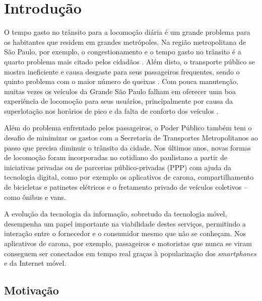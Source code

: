 \chapter{Introdução}
O tempo gasto no trânsito para a locomoção diária é um grande problema para os habitantes que residem em grandes metrópoles. Na região metropolitana de São Paulo, por exemplo, o congestionamento e o tempo gasto no trânsito é a quarto problema mais citado pelos cidadãos \cite{viveremsp}. Além disto, o transporte público se mostra ineficiente e causa desgaste para seus passageiros frequentes, sendo o quinto problema com o maior número de queixas \cite{mobilize}. Com pouca manutenção, muitas vezes os veículos da Grande São Paulo falham em oferecer uma boa experiência de locomoção para seus usuários, principalmente por causa da superlotação nos horários de pico e da falta de conforto dos veículos \cite{viveremsp}.

Além do problema enfrentado pelos passageiros, o Poder Público também tem o desafio de minimizar os gastos com a Secretaria de Transportes Metropolitanos ao passo que precisa diminuir o trânsito da cidade. Nos últimos anos, novas formas de locomoção foram incorporadas no cotidiano do paulistano a partir de iniciativas privadas ou de parcerias público-privadas (PPP) com ajuda da tecnologia digital, como por exemplo os aplicativos de carona, compartilhamento de bicicletas e patinetes elétricos e o fretamento privado de veículos coletivos -- como ônibus e vans. 


A evolução da tecnologia da informação, sobretudo da tecnologia móvel, desempenha um papel importante na viabilidade destes serviços, permitindo a interação entre o fornecedor e o consumidor mesmo que não se conheçam. Nos aplicativos de carona, por exemplo, passageiros e motoristas que nunca se viram conseguem ser conectados em tempo real graças à popularização dos \emph{smartphones} e da Internet móvel. 


\section{Motivação}


